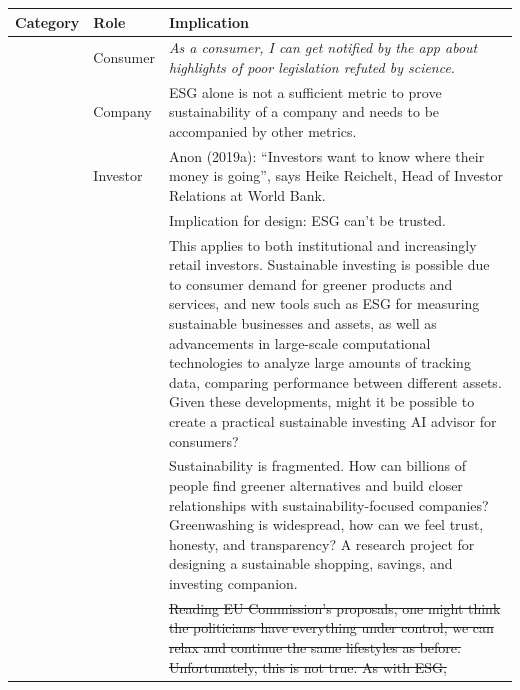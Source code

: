 \documentclass[
  letterpaper,
  DIV=11,
  numbers=noendperiod]{scrartcl}
\renewcommand{\st}[1]{\sout{#1}}
\begin{document}
\begin{longtable}[]{@{}
  >{\raggedright\arraybackslash}p{}
  >{\raggedright\arraybackslash}p{}
  >{\raggedright\arraybackslash}p{}@{}}
\toprule\noalign{}
\begin{minipage}[b]{\linewidth}\raggedright
Category
\end{minipage} & \begin{minipage}[b]{\linewidth}\raggedright
Role
\end{minipage} & \begin{minipage}[b]{\linewidth}\raggedright
Implication
\end{minipage} \\
\midrule\noalign{}
\endhead
\bottomrule\noalign{}
\endlastfoot
& Consumer & \emph{As a consumer, I can get notified by the app about
highlights of poor legislation refuted by science}. \\
& Company & ESG alone is not a sufficient metric to prove sustainability
of a company and needs to be accompanied by other metrics. \\
& Investor & Anon (2019a): ``Investors want to know where their money is
going'', says Heike Reichelt, Head of Investor Relations at World
Bank. \\
& & Implication for design: ESG can't be trusted. \\
& & This applies to both institutional and increasingly retail
investors. Sustainable investing is possible due to consumer demand for
greener products and services, and new tools such as ESG for measuring
sustainable businesses and assets, as well as advancements in
large-scale computational technologies to analyze large amounts of
tracking data, comparing performance between different assets. Given
these developments, might it be possible to create a practical
sustainable investing AI advisor for consumers? \\
& & Sustainability is fragmented. How can billions of people find
greener alternatives and build closer relationships with
sustainability-focused companies? Greenwashing is widespread, how can we
feel trust, honesty, and transparency? A research project for designing
a sustainable shopping, savings, and investing companion. \\
& & \st{Reading EU Commission's proposals, one might think the
politicians have everything under control, we can relax and continue the
same lifestyles as before. Unfortunately, this is not true. As with ESG,
}
\end{longtable}
\end{document}
